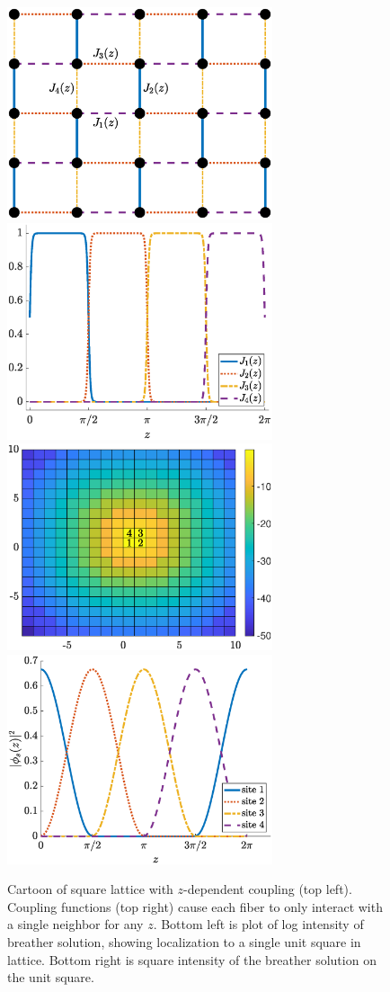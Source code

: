 \documentclass[12pt,reqno,oneside,hidelinks]{article}
\begin{document}
\begin{figure}
    \centering
    \includegraphics[width=7.8cm]{images/lattice.eps}
    \includegraphics[width=7.8cm]{images/Jplot.eps}
    \includegraphics[width=7.8cm]{images/fundc1map.eps}
    \includegraphics[width=7.8cm]{images/fundc1sol.eps}
    \caption{Cartoon of square lattice with $z$-dependent coupling (top left). Coupling functions (top right) cause each fiber to only interact with a single neighbor for any $z$. Bottom left is plot of log intensity of breather solution, showing localization to a single unit square in lattice. Bottom right is square intensity of the breather solution on the unit square.}
    \label{fig:Rechtsman}
\end{figure} 

\pagebreak

\footnotesize{  }
\end{document}
